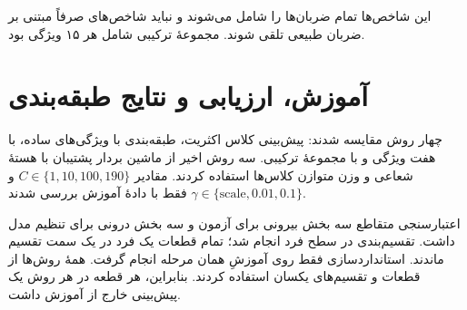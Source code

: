 \documentclass[11pt,a4paper]{article}
\begin{document}
این شاخص‌ها تمام ضربان‌ها را شامل می‌شوند و نباید شاخص‌های صرفاً مبتنی بر ضربان طبیعی تلقی شوند. مجموعهٔ ترکیبی شامل هر ۱۵ ویژگی بود.
\newpage
\section{آموزش، ارزیابی و نتایج طبقه‌بندی}
چهار روش مقایسه شدند: پیش‌بینی کلاس اکثریت، طبقه‌بندی با ویژگی‌های ساده، با هفت ویژگی  و با مجموعهٔ ترکیبی. سه روش اخیر از ماشین بردار پشتیبان با هستهٔ شعاعی  و وزن متوازن کلاس‌ها استفاده کردند. مقادیر \(C\in\{1,10,100,190\}\) و \(\gamma\in\{\mathrm{scale},0.01,0.1\}\) فقط با دادهٔ آموزش بررسی شدند.

اعتبارسنجی متقاطع سه بخش بیرونی برای آزمون و سه بخش درونی برای تنظیم مدل داشت. تقسیم‌بندی در سطح فرد انجام شد؛ تمام قطعات یک فرد در یک سمت تقسیم ماندند. استانداردسازی فقط روی آموزشِ همان مرحله انجام گرفت. همهٔ روش‌ها از قطعات و تقسیم‌های یکسان استفاده کردند. بنابراین، هر قطعه در هر روش یک پیش‌بینی خارج از آموزش داشت.
\end{document}
